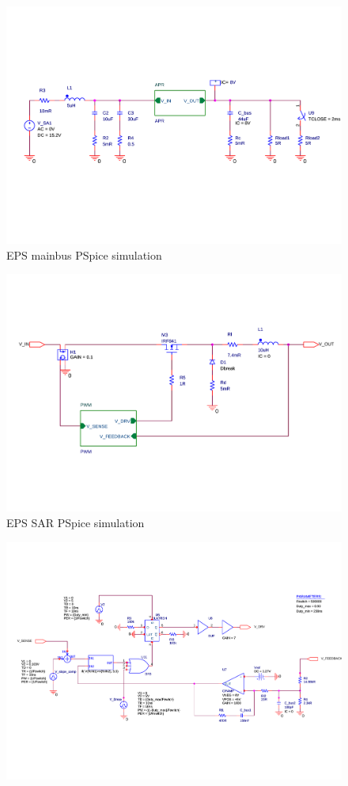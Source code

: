 \begin{appendices}
\begin{figure}
\centering
\includegraphics[scale=0.6]{figures/fig_CDR_PSpice_Mainbus}
\caption{\ac{EPS} mainbus PSpice simulation}
\label{fig:PSpice_mainbus}
\end{figure}
%
\begin{figure}
\centering
\includegraphics[scale=0.6]{figures/fig_CDR_PSpice_APR}
\caption{\ac{EPS} \ac{SAR} PSpice simulation}
\label{fig:PSpice_SAR}
\end{figure}
%
\begin{figure}
\centering
\includegraphics[scale=0.8]{figures/fig_CDR_PSpice_PWM}

\end{figure}
\end{appendices}
